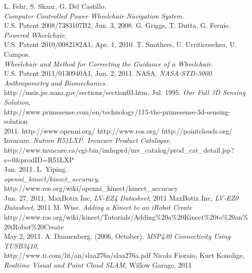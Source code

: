 \documentclass[oneside,final,a4paper]{report}
\begin{document}
\begin{thebibliography}{9}
  L. Fehr, S. Skaar, G. Del Castillo. \\
  \emph{Computer Controlled Power Wheelchair Navigation System.} \\
  U.S. Patent 2008/7383107B2, Jun. 3, 2008.
  G. Griggs, T. Dutta, G. Fernie. \emph{Powered Wheelchair},\\
  U.S. Patent 2010/0082182A1, Apr. 1, 2010.
  T. Smithers, U. Urriticoechea, U. Campos. \\
  \emph{Wheelchair and Method for Correcting the Guidance of a Wheelchair.} \\
  U.S. Patent 2011/0130940A1, Jun. 2, 2011.
  NASA. \emph{NASA-STD-3000. Anthropometry and Biomechanics.}\\
  http://msis.jsc.nasa.gov/sections/section03.htm, Jul. 1995.
  \emph{Our Full 3D Sensing Solution}, \\
  \mbox{http://www.primesense.com/en/technology/115-the-primesense-3d-sensing-solution} \\
  2011.
  http://www.openni.org/
  http://www.ros.org/
  http://pointclouds.org/
  Invacare. \emph{Nutron R51LXP. Invacare Product Catalogue.} \\
  http://www.invacare.ca/cgi-bin/imhqprd/inv\_catalog/prod\_cat\_detail.jsp?s=0\&prodID=R51LXP\\
 Jan. 2011.
  L. Yiping. \\
  \emph{openni\_kinect/kinect\_accuracy}, http://www.ros.org/wiki/openni\_kinect/kinect\_accuracy\\
  Jun. 27, 2011.
  MaxBotix Inc, \emph{LV-EZ4 Datasheet},  2011
  MaxBotix Inc, \emph{LV-EZ0 Datasheet},  2011
  M. Wise.  \emph{Adding a Kinect to an iRobot Create} \\
  http://www.ros.org/wiki/kinect/Tutorials/Adding\%20a\%20Kinect\%20to\%20an\%20iRobot\%20Create\\
  May 2, 2011.
  A. Dannenberg. (2006, October). \emph{MSP430 Connectivity Using TUSB3410},\\
  http://www.ti.com/lit/an/slaa276a/slaa276a.pdf
  Nicola Fioraio, Kurt Konolige, \emph{Realtime Visual and Point Cloud SLAM}, Willow Garage, 2011
\end{thebibliography}
\end{document}
